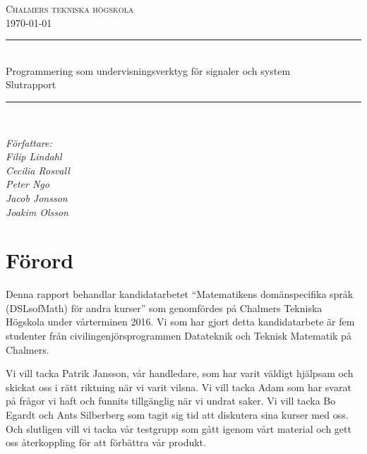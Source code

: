 \documentclass[]{article}
\date{\today}
\begin{document}
\begin{titlepage} \newcommand{\HRule}{\rule{\linewidth}{0.3mm}}
  \center
  \textsc{\Large Chalmers tekniska högskola}\\[0.05cm]
  \normalsize \today

  \HRule \\[0.08cm]
  { \large Programmering som undervisningsverktyg för signaler och system
    \\
    \normalsize{Slutrapport}
  } \\[0.08cm] %
  \HRule \\[0.3cm]

  \vfill

  \begin{flushleft}
    \small
    \emph{Författare: \\
      \quad Filip Lindahl\\
      \quad Cecilia Rosvall\\
      \quad Peter Ngo\\
      \quad Jacob Jonsson\\
      \quad Joakim Olsson\\}
  \end{flushleft}
\end{titlepage}
\newpage

\section*{Förord}
Denna rapport behandlar kandidatarbetet “Matematikens domänspecifika språk (DSLsofMath) för andra kurser” som
genomfördes på Chalmers Tekniska Högskola under vårterminen 2016. Vi som har gjort detta kandidatarbete är fem studenter
från civilingenjörsprogrammen Datateknik och Teknisk Matematik på Chalmers.

Vi vill tacka Patrik Jansson, vår handledare, som har varit väldigt hjälpsam och skickat oss i rätt riktning när vi
varit vilsna. Vi vill tacka Adam som har svarat på frågor vi haft och funnits tillgänglig när vi undrat saker. Vi vill
tacka Bo Egardt och Ants Silberberg som tagit sig tid att diskutera sina kurser med oss. Och slutligen vill vi tacka vår
testgrupp som gått igenom vårt material och gett oss återkoppling för att förbättra vår produkt.
\end{document}

